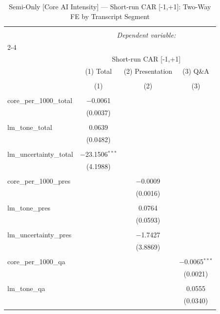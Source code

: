 
\begin{table}[!htbp] \centering 
  \caption{Semi-Only [Core AI Intensity] — Short-run CAR [-1,+1]: Two-Way FE by Transcript Segment} 
  \label{} 
\begin{tabular}{@{\extracolsep{5pt}}lccc} 
\\[-1.8ex]\hline 
\hline \\[-1.8ex] 
 & \multicolumn{3}{c}{\textit{Dependent variable:}} \\ 
\cline{2-4} 
\\[-1.8ex] & \multicolumn{3}{c}{Short-run CAR [-1,+1]} \\ 
 & (1) Total & (2) Presentation & (3) Q\&A \\ 
\\[-1.8ex] & (1) & (2) & (3)\\ 
\hline \\[-1.8ex] 
 core\_per\_1000\_total & $-$0.0061 &  &  \\ 
  & (0.0037) &  &  \\ 
  & & & \\ 
 lm\_tone\_total & 0.0639 &  &  \\ 
  & (0.0482) &  &  \\ 
  & & & \\ 
 lm\_uncertainty\_total & $-$23.1506$^{***}$ &  &  \\ 
  & (4.1988) &  &  \\ 
  & & & \\ 
 core\_per\_1000\_pres &  & $-$0.0009 &  \\ 
  &  & (0.0016) &  \\ 
  & & & \\ 
 lm\_tone\_pres &  & 0.0764 &  \\ 
  &  & (0.0593) &  \\ 
  & & & \\ 
 lm\_uncertainty\_pres &  & $-$1.7427 &  \\ 
  &  & (3.8869) &  \\ 
  & & & \\ 
 core\_per\_1000\_qa &  &  & $-$0.0065$^{***}$ \\ 
  &  &  & (0.0021) \\ 
  & & & \\ 
 lm\_tone\_qa &  &  & 0.0555 \\ 
  &  &  & (0.0340) \\ 
  & & & \\ 

\end{tabular}
\end{table}
